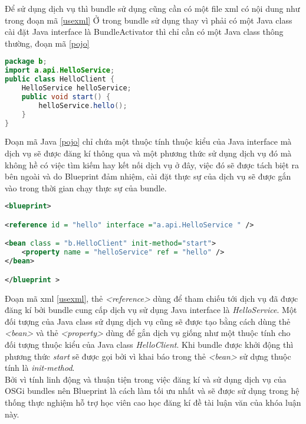 Để sử dụng dịch vụ thì bundle sử dụng cũng cần có một file xml có nội dung như trong đoạn mã \ref{usexml}
Ở trong bundle sử dụng thay vì phải có một Java class cài đặt Java interface là {BundleActivator} thì chỉ cần có một Java class thông thường, đoạn mã \ref{pojo}
\begin{lstlisting}[label=pojo, 
inputencoding=utf8,
breaklines=true,
language=Java,
basicstyle=\ttfamily\footnotesize,
caption=Java class sử dụng dịch vụ]
package b;
import a.api.HelloService;
public class HelloClient {
    HelloService helloService;
    public void start() {
        helloService.hello();
    }
}
\end{lstlisting}
Đoạn mã Java \ref{pojo} chỉ chứa một thuộc tính thuộc kiểu của Java interface mà dịch vụ sẽ được đăng kí thông qua và một phương thức sử dụng dịch vụ đó mà không hề có việc tìm kiếm hay kết nối dịch vụ ở đây, việc đó sẽ được tách biệt ra bên ngoài và do Blueprint đảm nhiệm, cài đặt thực sự của dịch vụ sẽ được gắn vào trong thời gian chạy thực sự của bundle.
\begin{lstlisting}[label=usexml, 
inputencoding=utf8,
breaklines=true,
language=xml,
basicstyle=\ttfamily\footnotesize,
caption=Sử dung dịch vụ dùng Blueprint]
<blueprint>

<reference id = "hello" interface ="a.api.HelloService " />

<bean class = "b.HelloClient" init-method="start">
    <property name = "helloService" ref = "hello" />
</bean>

</blueprint >
\end{lstlisting}
 
Đoạn mã xml \ref{usexml}, thẻ \textit{<reference>} dùng để tham chiếu tới dịch vụ đã được đăng kí bởi bundle cung cấp dịch vụ sử dụng Java interface là \textit{HelloService}. Một đối tượng của Java class sử dụng dịch vụ cũng sẽ được tạo bằng cách dùng thẻ \textit{<bean>} và thẻ \textit{<property>} dùng để gắn dịch vụ giống như một thuộc tính cho đối tượng thuộc kiểu của Java class \textit{HelloClient}. Khi bundle được khởi động thì phương thức \textit{start} sẽ được gọi bởi vì khai báo trong thẻ \textit{<bean>} sử dựng thuộc tính là \textit{init-method}.\\

Bởi vì tính linh động và thuận tiện trong việc đăng kí và sử dụng dịch vụ của OSGi bundles nên Blueprint là cách làm tối ưu nhất và sẽ được sử dụng trong hệ thống thực nghiệm hỗ trợ học viên cao học đăng kí đề tài luận văn của khóa luận này.
